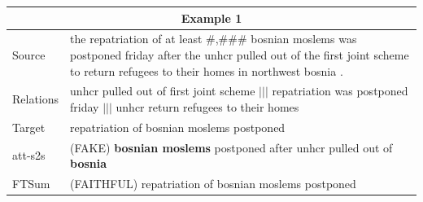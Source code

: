 \documentclass[letterpaper]{article} %
\begin{document}
	
	\begin{table}[ht]
		\centering
		\begin{tabularx}{\linewidth}{p{1.2cm}|X}
			\hline
			\multicolumn{2}{c}{Example 1}                                                                                                                                                                                              \\ \hline
			\multicolumn{1}{l|}{Source}    & the repatriation of at least \#,\#\#\# bosnian moslems was postponed friday after the unhcr pulled out of the first joint scheme to return refugees to their homes in northwest bosnia .                      \\ \hline
			\multicolumn{1}{l|}{Relations} & unhcr pulled out of first joint scheme $|||$ repatriation was postponed friday $|||$ unhcr return refugees to their homes                                                                            \\ \hline
			\multicolumn{1}{l|}{Target}    & repatriation of bosnian moslems postponed                                                                                                                              \\ \hline
			\multicolumn{1}{l|}{att-s2s}   & (FAKE) \textbf{bosnian moslems} postponed after unhcr pulled out of \textbf{bosnia}                                                                                                                \\ \hline
			\multicolumn{1}{l|}{FTSum}     & (FAITHFUL) repatriation of bosnian moslems postponed                                                                                                               \\ \hline

\end{tabularx}
\end{table}
\end{document}

